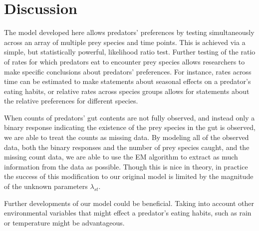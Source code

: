 \section{Discussion}
\label{sec:discussion}

The model developed here allows predators' preferences by testing simultaneously across an array of multiple prey species and time points.  This is achieved via a simple, but statistically powerful, likelihood ratio test.  Further testing of the ratio of rates for which predators eat to encounter prey species allows researchers to make specific conclusions about predators' preferences.  For instance, rates across time can be estimated to make statements about seasonal effects on a predator's eating habits, or relative rates across species groups allows for statements about the relative preferences for different species.

When counts of predators' gut contents are not fully observed, and instead only a binary response indicating the existence of the prey species in the gut is observed, we are able to treat the counts as missing data.  By modeling all of the observed data, both the binary responses and the number of prey species caught, and the missing count data, we are able to use the EM algorithm to extract as much information from the data as possible.  Though this is nice in theory, in practice the success of this modification to our original model is limited by the magnitude of the unknown parameters $\lambda_{st}$.  

Further developments of our model could be beneficial.  Taking into account other environmental variables that might effect a predator's eating habits, such as rain or temperature might be advantageous.  

